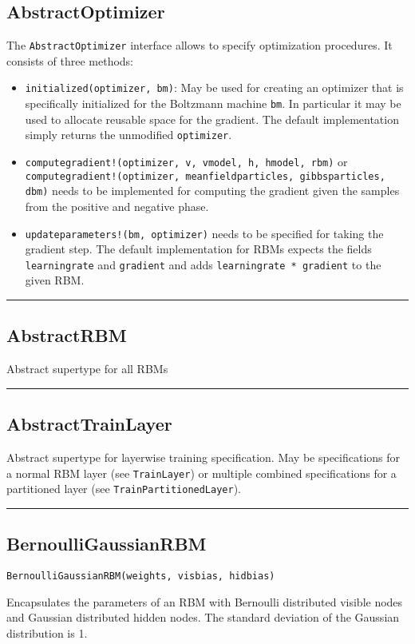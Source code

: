 \subsection*{AbstractOptimizer}
The \texttt{AbstractOptimizer} interface allows to specify optimization procedures. It consists of three methods:

\begin{itemize}
\item \texttt{initialized(optimizer, bm)}: May be used for creating an optimizer that is  specifically initialized for the Boltzmann machine \texttt{bm}.  In particular it may be used to allocate reusable space for the gradient.  The default implementation simply returns the unmodified \texttt{optimizer}.


\item \texttt{computegradient!(optimizer, v, vmodel, h, hmodel, rbm)} or \texttt{computegradient!(optimizer, meanfieldparticles, gibbsparticles, dbm)}  needs to be implemented for computing the gradient given the samples  from the positive and negative phase.


\item \texttt{updateparameters!(bm, optimizer)} needs to be specified for taking the  gradient step. The default implementation for RBMs expects the fields  \texttt{learningrate} and \texttt{gradient} and adds \texttt{learningrate * gradient} to the  given RBM.

\end{itemize}
\noindent\rule{\textwidth}{1pt}
\subsection*{AbstractRBM}
Abstract supertype for all RBMs 

\noindent\rule{\textwidth}{1pt}
\subsection*{AbstractTrainLayer}
Abstract supertype for layerwise training specification. May be specifications for a normal RBM layer (see \texttt{TrainLayer}) or multiple combined specifications for a partitioned layer (see \texttt{TrainPartitionedLayer}).

\noindent\rule{\textwidth}{1pt}
\subsection*{BernoulliGaussianRBM}
\begin{verbatim}
BernoulliGaussianRBM(weights, visbias, hidbias)
\end{verbatim}
Encapsulates the parameters of an RBM with Bernoulli distributed visible nodes and Gaussian distributed hidden nodes. The standard deviation of the Gaussian distribution is 1.

